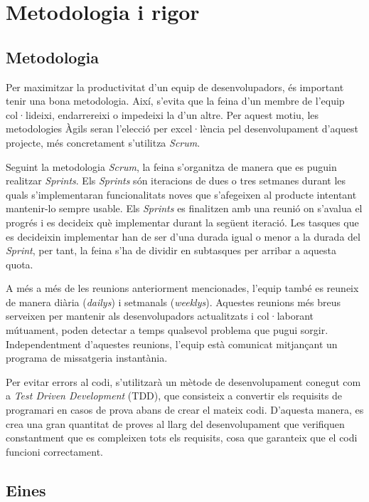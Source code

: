 \section{Metodologia i rigor}

\subsection{Metodologia}
Per maximitzar la productivitat d'un equip de desenvolupadors, és important tenir una bona metodologia. Així, s'evita que la feina d'un membre de l'equip col·lideixi, endarrereixi o impedeixi la d'un altre. Per aquest motiu, les metodologies Àgils seran l'elecció per excel·lència pel desenvolupament d'aquest projecte, més concretament s'utilitza \textit{Scrum}.

Seguint la metodologia \textit{Scrum}, la feina s'organitza de manera que es puguin realitzar \textit{Sprints}. Els \textit{Sprints} són iteracions de dues o tres setmanes durant les quals s'implementaran funcionalitats noves que s'afegeixen al producte intentant mantenir-lo sempre usable. Els \textit{Sprints} es finalitzen amb una reunió on s'avalua el progrés i es decideix què implementar durant la següent iteració. Les tasques que es decideixin implementar han de ser d'una durada igual o menor a la durada del \textit{Sprint}, per tant, la feina s'ha de dividir en subtasques per arribar a aquesta quota.

A més a més de les reunions anteriorment mencionades, l'equip també es reuneix de manera diària (\textit{dailys}) i setmanals (\textit{weeklys}). Aquestes reunions més breus serveixen per mantenir als desenvolupadors actualitzats i col·laborant mútuament, poden detectar a temps qualsevol problema que pugui sorgir. Independentment d'aquestes reunions, l'equip està comunicat mitjançant un programa de missatgeria instantània.

Per evitar errors al codi, s'utilitzarà un mètode de desenvolupament conegut com a \textit{Test Driven Development} (TDD), que consisteix a convertir els requisits de programari en casos de prova abans de crear el mateix codi. D'aquesta manera, es crea una gran quantitat de proves al llarg del desenvolupament que verifiquen constantment que es compleixen tots els requisits, cosa que garanteix que el codi funcioni correctament.

\subsection{Eines}

